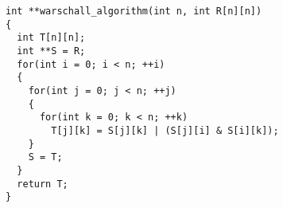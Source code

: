 \documentclass[a5paper]{article}
\begin{document}

\begin{lstlisting}
int **warschall_algorithm(int n, int R[n][n])
{
  int T[n][n];
  int **S = R;
  for(int i = 0; i < n; ++i)
  {
    for(int j = 0; j < n; ++j)
    {
      for(int k = 0; k < n; ++k)
        T[j][k] = S[j][k] | (S[j][i] & S[i][k]);
    }
    S = T;
  }
  return T;
}
\end{lstlisting}
\end{document}
